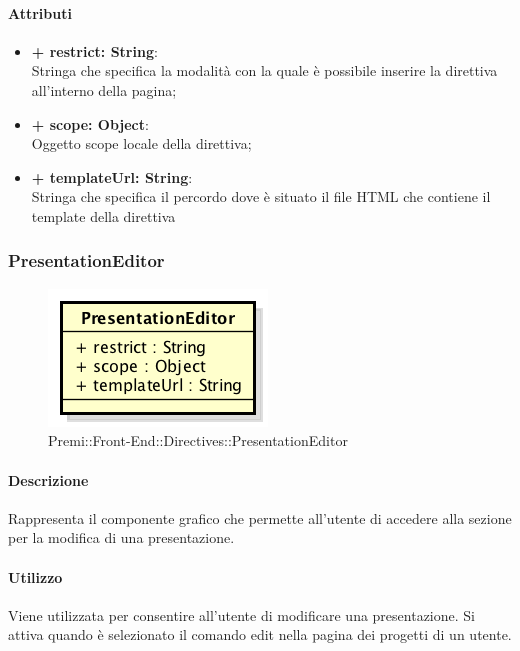 	\paragraph{Attributi}
	\begin{itemize}
		\item \textbf{+ restrict: String}:\\
		Stringa che specifica la modalità con la quale è possibile inserire la direttiva all'interno della pagina;
		\item \textbf{+ scope: Object}:\\
		Oggetto scope locale della direttiva;
		\item \textbf{+ templateUrl: String}:\\
		Stringa che specifica il percordo dove è situato il file \gls{HTML} che contiene il \gls{template} della direttiva
	\end{itemize}
\newpage


\subsubsection{PresentationEditor}
	\begin{figure}[h]
		\centering
		\includegraphics[width=0.5\linewidth]{img/premi_front_end_directives_presentationeditor}
		\caption[Premi::Front-End::Directives::PresentationEditor]{Premi::Front-End::Directives::PresentationEditor}
	\end{figure}
	
	\paragraph{Descrizione}
	Rappresenta il componente grafico che permette all'utente di accedere alla sezione per la modifica di una presentazione.
	
	\paragraph{Utilizzo}
	Viene utilizzata per consentire all'utente di modificare una presentazione. Si attiva quando è selezionato il comando edit nella pagina dei progetti di un utente.
	
